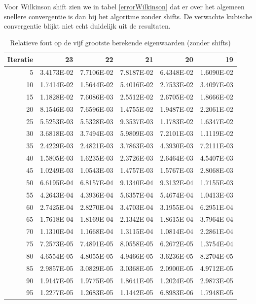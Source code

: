 \documentclass[a4paper, 12pt, titlepage]{report}
\begin{document}
Voor Wilkinson shift zien we in tabel \ref{errorWilkinson} dat er over het algemeen snellere convergentie is dan bij het algoritme zonder shifts. De verwachte kubische convergentie blijkt niet echt duidelijk uit de resultaten. 
\begin{center}
\begin{table}

\begin{tabular}{r||r|r|r|r|r}

Iteratie & 23 & 22& 21&20&19 \\
\hline
5	&	3.4173E-02	&	7.7106E-02	&	7.8187E-02	&	6.4348E-02	&	1.6090E-02	\\
10	&	1.7414E-02	&	1.5644E-02	&	5.4016E-02	&	2.7533E-02	&	3.4097E-03	\\
15	&	1.1828E-02	&	7.6086E-03	&	2.5512E-02	&	2.6705E-02	&	1.8666E-02	\\
20	&	8.1546E-03	&	7.6596E-03	&	1.4755E-02	&	1.9487E-02	&	2.2061E-02	\\
25	&	5.5253E-03	&	5.5328E-03	&	9.3537E-03	&	1.1783E-02	&	1.6347E-02	\\
30	&	3.6818E-03	&	3.7494E-03	&	5.9809E-03	&	7.2101E-03	&	1.1119E-02	\\
35	&	2.4229E-03	&	2.4821E-03	&	3.7863E-03	&	4.3930E-03	&	7.2111E-03	\\
40	&	1.5805E-03	&	1.6235E-03	&	2.3726E-03	&	2.6464E-03	&	4.5407E-03	\\
45	&	1.0249E-03	&	1.0543E-03	&	1.4757E-03	&	1.5767E-03	&	2.8068E-03	\\
50	&	6.6195E-04	&	6.8157E-04	&	9.1340E-04	&	9.3132E-04	&	1.7155E-03	\\
55	&	4.2643E-04	&	4.3936E-04	&	5.6357E-04	&	5.4674E-04	&	1.0413E-03	\\
60	&	2.7425E-04	&	2.8270E-04	&	3.4703E-04	&	3.1955E-04	&	6.2951E-04	\\
65	&	1.7618E-04	&	1.8169E-04	&	2.1342E-04	&	1.8615E-04	&	3.7964E-04	\\
70	&	1.1310E-04	&	1.1668E-04	&	1.3115E-04	&	1.0814E-04	&	2.2861E-04	\\
75	&	7.2573E-05	&	7.4891E-05	&	8.0558E-05	&	6.2672E-05	&	1.3754E-04	\\
80	&	4.6554E-05	&	4.8055E-05	&	4.9466E-05	&	3.6236E-05	&	8.2704E-05	\\
85	&	2.9857E-05	&	3.0829E-05	&	3.0368E-05	&	2.0900E-05	&	4.9712E-05	\\
90	&	1.9147E-05	&	1.9775E-05	&	1.8641E-05	&	1.2024E-05	&	2.9873E-05	\\
95	&	1.2277E-05	&	1.2683E-05	&	1.1442E-05	&	6.8983E-06	&	1.7948E-05	\\

\end{tabular}
\caption{Relatieve fout op de vijf grootste berekende eigenwaarden (zonder shifts)}
\label{errorNoShift}
\end{table}
\end{center}
\end{document}
